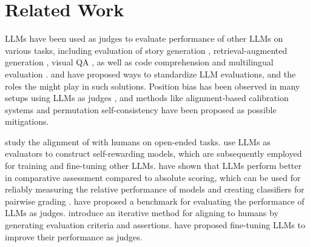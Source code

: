 \section {Related Work}\label{sec:relatedwork}

LLMs have been used as judges to evaluate performance of other LLMs on various tasks, including evaluation of story generation \citep{chiang2023can}, retrieval-augmented generation \citep{es2023ragas},  visual QA \citep{maas2024improving}, as well as code comprehension \citep{yuan2023evaluating} and multilingual evaluation \citep{hada2023large}. \citet{Zhang2024LLMEval} and \citet{sottana2023evaluation} have proposed ways to standardize LLM evaluations, and the roles the \judgemodels might play in such solutions.
%
Position bias has been observed in many setups using LLMs as judges \citep{zheng2023large, wang2023large}, and methods like alignment-based calibration systems \citep{li2023split} and permutation self-consistency \citep{tang2023found} have been proposed as possible mitigations.

\citet{judgingllms} study the alignment of \judgemodels with humans on open-ended tasks. \citet{selfrewardingmodels} use LLMs as evaluators to construct self-rewarding models, which are subsequently employed for training and fine-tuning other LLMs.
%
\citet{liusie2024llm} have shown that LLMs perform better in comparative assessment compared to absolute scoring, which can be used for reliably measuring the relative performance of models \citep{liu2024aligning} and creating classifiers for pairwise grading \cite{llmasclassifier}.
%
\citet{zeng2023evaluating} have proposed a benchmark for evaluating the performance of LLMs as judges. \citet{shankar2024validates} introduce an iterative method for aligning \judgemodels to humans by generating evaluation criteria and assertions. \citet{judgelm} have proposed fine-tuning LLMs to improve their performance as judges.


